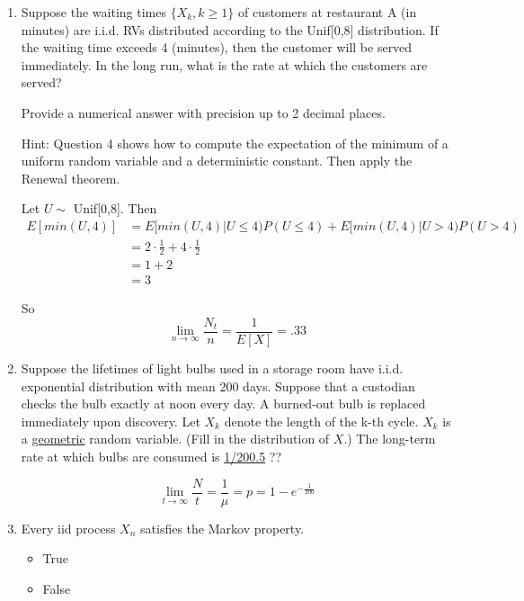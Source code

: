 \documentclass[10pt]{article}
\begin{document}
\begin{enumerate}
\newpage

  \item Suppose the waiting times $\{X_k, k \geq 1\}$ of customers at
    restaurant A (in minutes) are i.i.d. RVs distributed according to the
    Unif[0,8] distribution. If the waiting time exceeds 4 (minutes), then
    the customer will be served immediately. In the long run, what is the
    rate at which the customers are served? 

    Provide a numerical answer with precision up to 2 decimal places.

    Hint: Question 4 shows how to compute the expectation of the minimum of
    a uniform random variable and a deterministic constant. Then apply the
    Renewal theorem. 

    Let $U \sim$ Unif[0,8].  Then
    \begin{align*}
      E[min(U, 4)] &= E[min(U, 4) | U \leq 4)P(U \leq 4) + 
                              E[min(U,4) | U > 4)P(U > 4) \\
                   &= 2 \cdot  \frac{1}{2} + 4 \cdot  \frac{1}{2}  \\
                   &= 1 + 2  \\
                   &= 3
    \end{align*}

    So 
    \[ \lim_{n \to \infty} \frac{N_t}{n} = \frac{1}{E[X]} = .33 \]

\newpage

  \item Suppose the lifetimes of light bulbs used in a storage room have
    i.i.d. exponential distribution with mean 200 days. Suppose that a
    custodian checks the bulb exactly at noon every day. A burned-out bulb
    is replaced immediately upon discovery. Let $X_k$ denote the length of
    the k-th cycle. $X_k$ is a \underline{geometric} random variable.
    (Fill in the distribution of $X$.) The long-term rate at which bulbs
    are consumed is \underline{1/200.5} ??

    \[ \lim_{t \to \infty} \frac{N}{t} = \frac{1}{\mu} = p = 1-e^
    {-\frac{1}{200}} \]

\newpage

  \item Every iid process $X_n$ satisfies the Markov property.
    \begin{itemize}
      \item True \checkmark
      \item False
    \end{itemize}


\end{enumerate}
\end{document}
